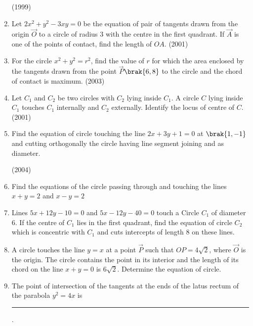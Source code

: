 \begin{enumerate}
                  \hfill(1999)
%
%
\item Let $2x^2+y^2-3xy=0$ be the equation of pair of tangents drawn from the origin $\vec{O}$ to a circle of radius 3 with the centre in the first quadrant. If $\vec{A}$ is one of the points of contact,  find the length of $OA$.                   \hfill(2001)
%
%
%
\item For the circle $x^2+y^2=r^2$,  find the value of $r$ for which the area enclosed by the tangents drawn from the point $\vec{P}$$\brak{6, 8}$ to the circle and the chord of contact is maximum.
%
%
\hfill(2003) 
%
\item Let $C_{1}$ and $C_{2}$ be two circles with $C_{2}$ lying inside $C_{1}$. A circle $C$ lying inside $C_{1}$ touches $C_{1}$ internally and $C_{2}$ externally. Identify the locus of centre of $C$.                                \hfill(2001)
%
%
%
%
%
%
\item Find the equation of circle touching the line $2x+3y+1=0$ at $\brak{1, -1}$ and cutting orthogonally the circle having line segment joining  and  as diameter.

\hfill(2004)     
\item Find the equations of the circle passing through  and touching the lines $x+y=2$ and $x-y=2$
%
\hfill {}
\item Lines $5x+12y-10=0$ and $5x-12y-40=0$ touch a Circle $C_1$ of diameter 6. If the centre of $C_1$ lies in the first quadrant,  find the equation of circle $C_2$ which is concentric with $C_1$ and cuts intercepts of length 8 on these lines.
%
\hfill {}
\item A circle touches the line $y=x$ at a point $\vec{P}$ such that $OP=4\sqrt{2}$,  where $\vec{O}$ is the origin. The circle contains the point  in its interior and the length of its chord on the line $x+y=0$ is $6\sqrt{2}$. Determine the equation of circle.
%
\hfill {}
     \item The point of intersection of the tangents at the ends of the latus rectum of the parabola $y^2=4x$ is \rule{1cm}{0.1pt}.
    \hfill{}
    

\end{enumerate}

